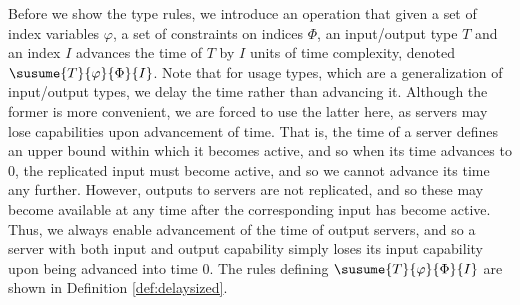 %
%
Before we show the type rules, we introduce an operation that given a set of index variables $\varphi$, a set of constraints on indices $\Phi$, an input/output type $T$ and an index $I$ advances the time of $T$ by $I$ units of time complexity, denoted $\susume{T}{\varphi}{\Phi}{I}$. Note that for usage types, which are a generalization of input/output types, we delay the time rather than advancing it. Although the former is more convenient, we are forced to use the latter here, as servers may lose capabilities upon advancement of time. That is, the time of a server defines an upper bound within which it becomes active, and so when its time advances to 0, the replicated input must become active, and so we cannot advance its time any further. However, outputs to servers are not replicated, and so these may become available at any time after the corresponding input has become active. Thus, we always enable advancement of the time of output servers, and so a server with both input and output capability simply loses its input capability upon being advanced into time 0. The rules defining $\susume{T}{\varphi}{\Phi}{I}$ are shown in Definition \ref{def:delaysized}.
